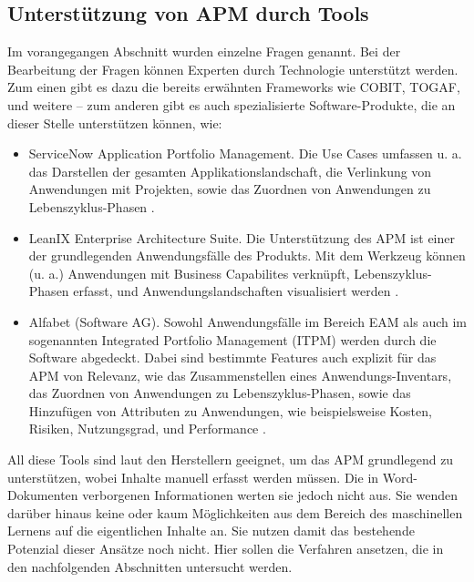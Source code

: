 \subsection{Unterstützung von APM durch Tools}
Im vorangegangen Abschnitt wurden einzelne Fragen genannt. Bei der Bearbeitung der Fragen können  Experten durch Technologie unterstützt werden. Zum einen gibt es dazu die bereits erwähnten Frameworks wie COBIT, TOGAF, und weitere – zum anderen gibt es auch spezialisierte Software-Produkte, die an dieser Stelle unterstützen können, wie:

\begin{itemize}
\item ServiceNow Application Portfolio Management. Die Use Cases umfassen u. a. das Darstellen der gesamten Applikationslandschaft, die Verlinkung von Anwendungen mit Projekten, sowie das Zuordnen von Anwendungen zu Lebenszyklus-Phasen \cite{servicenow}.
\item LeanIX Enterprise Architecture Suite. Die Unterstützung des APM ist einer der grundlegenden Anwendungsfälle des Produkts. Mit dem Werkzeug können (u. a.) Anwendungen mit Business Capabilites verknüpft, Lebenszyklus-Phasen erfasst, und Anwendungslandschaften visualisiert werden \cite{leanix}.
\item Alfabet (Software AG). Sowohl Anwendungsfälle im Bereich EAM als auch im sogenannten Integrated Portfolio Management (ITPM) werden durch die Software abgedeckt. Dabei sind bestimmte Features auch explizit für das APM von Relevanz, wie das Zusammenstellen eines Anwendungs-Inventars, das Zuordnen von Anwendungen zu Lebenszyklus-Phasen, sowie das Hinzufügen von Attributen zu Anwendungen, wie beispielsweise Kosten, Risiken, Nutzungsgrad, und Performance \cite{softwareag}.
\end{itemize} 

All diese Tools sind laut den Herstellern geeignet, um das APM grundlegend zu unterstützen, wobei Inhalte manuell erfasst werden müssen. Die in Word-Dokumenten verborgenen Informationen werten sie jedoch nicht aus. Sie wenden darüber hinaus keine oder kaum Möglichkeiten aus dem Bereich des maschinellen Lernens auf die eigentlichen Inhalte an. Sie nutzen damit das bestehende Potenzial dieser Ansätze noch nicht. Hier sollen die Verfahren ansetzen, die in den nachfolgenden Abschnitten untersucht werden.

